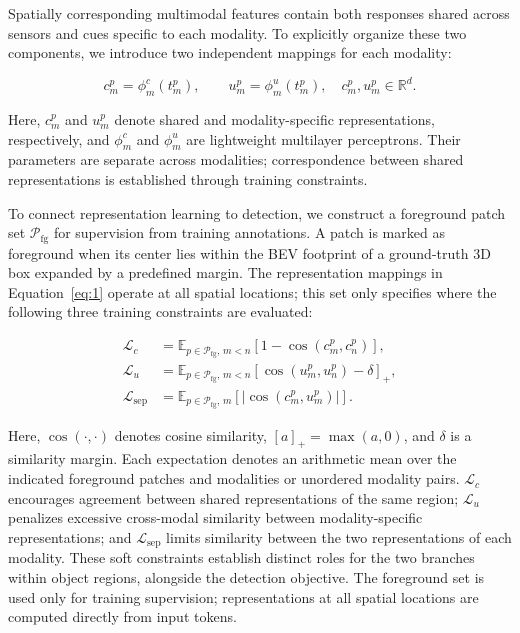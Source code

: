 Spatially corresponding multimodal features contain both responses shared across sensors and cues specific to each modality. To explicitly organize these two components, we introduce two independent mappings for each modality:

\begin{equation}
c_m^p=\phi_m^{c}(t_m^p),\qquad
u_m^p=\phi_m^{u}(t_m^p),
\quad c_m^p,u_m^p\in\mathbb R^d.
\label{eq:1}
\end{equation}

Here, \(c_m^p\) and \(u_m^p\) denote shared and modality-specific representations, respectively, and \(\phi_m^c\) and \(\phi_m^u\) are lightweight multilayer perceptrons. Their parameters are separate across modalities; correspondence between shared representations is established through training constraints.

To connect representation learning to detection, we construct a foreground patch set \(\mathcal P_{\mathrm{fg}}\) for supervision from training annotations. A patch is marked as foreground when its center lies within the BEV footprint of a ground-truth 3D box expanded by a predefined margin. The representation mappings in Equation~\eqref{eq:1} operate at all spatial locations; this set only specifies where the following three training constraints are evaluated:

\begin{equation}
\begin{aligned}
\mathcal L_c
&=\mathbb E_{p\in\mathcal P_{\mathrm{fg}},\,m<n}
\left[1-\operatorname{cos}(c_m^p,c_n^p)\right],\\
\mathcal L_u
&=\mathbb E_{p\in\mathcal P_{\mathrm{fg}},\,m<n}
\left[\operatorname{cos}(u_m^p,u_n^p)-\delta\right]_+,\\
\mathcal L_{\mathrm{sep}}
&=\mathbb E_{p\in\mathcal P_{\mathrm{fg}},\,m}
\left[\left|\operatorname{cos}(c_m^p,u_m^p)\right|\right].
\end{aligned}
\label{eq:2}
\end{equation}

Here, \(\operatorname{cos}(\cdot,\cdot)\) denotes cosine similarity, \([a]_+=\max(a,0)\), and \(\delta\) is a similarity margin. Each expectation denotes an arithmetic mean over the indicated foreground patches and modalities or unordered modality pairs. \(\mathcal L_c\) encourages agreement between shared representations of the same region; \(\mathcal L_u\) penalizes excessive cross-modal similarity between modality-specific representations; and \(\mathcal L_{\mathrm{sep}}\) limits similarity between the two representations of each modality. These soft constraints establish distinct roles for the two branches within object regions, alongside the detection objective. The foreground set is used only for training supervision; representations at all spatial locations are computed directly from input tokens.

